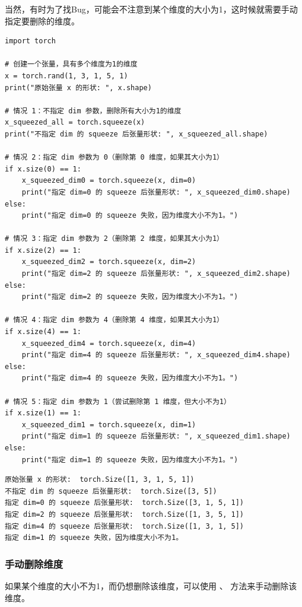 当然，有时为了找Bug，可能会不注意到某个维度的大小为1，这时候就需要手动指定要删除的维度。
\begin{lstlisting}[style=pythonstyle]
import torch

# 创建一个张量，具有多个维度为1的维度
x = torch.rand(1, 3, 1, 5, 1)
print("原始张量 x 的形状: ", x.shape)

# 情况 1：不指定 dim 参数，删除所有大小为1的维度
x_squeezed_all = torch.squeeze(x)
print("不指定 dim 的 squeeze 后张量形状: ", x_squeezed_all.shape)

# 情况 2：指定 dim 参数为 0（删除第 0 维度，如果其大小为1）
if x.size(0) == 1:
    x_squeezed_dim0 = torch.squeeze(x, dim=0)
    print("指定 dim=0 的 squeeze 后张量形状: ", x_squeezed_dim0.shape)
else:
    print("指定 dim=0 的 squeeze 失败，因为维度大小不为1。")

# 情况 3：指定 dim 参数为 2（删除第 2 维度，如果其大小为1）
if x.size(2) == 1:
    x_squeezed_dim2 = torch.squeeze(x, dim=2)
    print("指定 dim=2 的 squeeze 后张量形状: ", x_squeezed_dim2.shape)
else:
    print("指定 dim=2 的 squeeze 失败，因为维度大小不为1。")

# 情况 4：指定 dim 参数为 4（删除第 4 维度，如果其大小为1）
if x.size(4) == 1:
    x_squeezed_dim4 = torch.squeeze(x, dim=4)
    print("指定 dim=4 的 squeeze 后张量形状: ", x_squeezed_dim4.shape)
else:
    print("指定 dim=4 的 squeeze 失败，因为维度大小不为1。")

# 情况 5：指定 dim 参数为 1（尝试删除第 1 维度，但大小不为1）
if x.size(1) == 1:
    x_squeezed_dim1 = torch.squeeze(x, dim=1)
    print("指定 dim=1 的 squeeze 后张量形状: ", x_squeezed_dim1.shape)
else:
    print("指定 dim=1 的 squeeze 失败，因为维度大小不为1。")
\end{lstlisting}
\begin{lstlisting}[style=demostyle,numbers=none]
原始张量 x 的形状:  torch.Size([1, 3, 1, 5, 1])
不指定 dim 的 squeeze 后张量形状:  torch.Size([3, 5])
指定 dim=0 的 squeeze 后张量形状:  torch.Size([3, 1, 5, 1])
指定 dim=2 的 squeeze 后张量形状:  torch.Size([1, 3, 5, 1])
指定 dim=4 的 squeeze 后张量形状:  torch.Size([1, 3, 1, 5])
指定 dim=1 的 squeeze 失败，因为维度大小不为1。
\end{lstlisting}    

\subsubsection{手动删除维度}
\label{subsubsec:Pytorch的手动删除维度}
如果某个维度的大小不为1，而仍想删除该维度，可以使用 、 方法来手动删除该维度。

